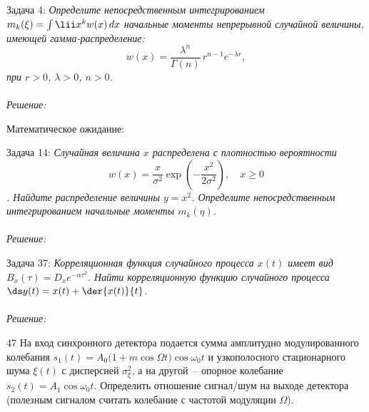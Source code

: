 \documentclass[pscyr]{hedwork}
\newenvironment{task}[2]
  {Задача #1: \emph{#2} \\ \bigskip \\ \emph{Решение:}}{\newpage}
\newenvironment{task*}[2]
  {Задача #1: \emph{#2} \\ \bigskip \\ \emph{Решение:}}{}
\begin{document}
  \maketitle

  \begin{task}{4}{
    Определите непосредственным интегрированием
    \( m_k(\xi) = \int\lii x^k w(x)\,dx \) начальные моменты непрерывной
    случайной величины, имеющей гамма-распределение:
    \[
      w(x) = \frac{\lambda^n}{\Gamma(n)}\,r^{n - 1} e^{-\lambda r},
    \]
    при \( r > 0 \), \( \lambda > 0 \), \( n > 0 \).
  }

    Математическое ожидание:
  \end{task}

  \begin{task}{14}{
    Случайная величина \( x \) распределена с плотностью вероятности
    \[
      w(x) = \frac{x}{\sigma^2}\exp\left(-\frac{x^2}{2\sigma^2}\right),
        \quad x \ge 0
    \].
    Найдите распределение величины \( y = x^2 \). Определите непосредственным
    интегрированием начальные моменты \( m_k(\eta) \).
  }
    
  \end{task}
  
  \begin{task}{37}{
    Корреляционная функция случайного процесса \( x(t) \) имеет вид
    \( B_x(\tau) = D_x e^{-\alpha \tau^2} \). Найти корреляционную функцию
    случайного процесса \( \ds y(t) = x(t) + \der{x(t)}{t} \).
  }
  
  \end{task}
  
  \begin{task*}{47}{
    На вход синхронного детектора подается сумма амплитудно модулированного
    колебания \( s_1(t) = A_0 \bigl(1 + m\cos\Omega t\big) \cos\omega_0 t \)
    и узкополосного стационарного шума \( \xi(t) \) с дисперсией
    \( \sigma_\xi^2 \), а на другой~-- опорное колебание
    \( s_2(t) = A_1\cos\omega_0 t \). Определить отношение сигнал/шум на выходе
    детектора (полезным сигналом считать колебание с частотой модуляции
    \( \Omega \)).
  }
  
  \end{task*}
\end{document}
